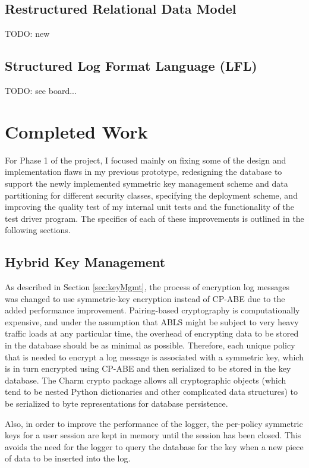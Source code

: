 \documentclass{sig-alternate}
\begin{document}
\subsection{Restructured Relational Data Model}
TODO: new 

\subsection{Structured Log Format Language (LFL)}
TODO: see board...

\section{Completed Work}
For Phase 1 of the project, I focused mainly on fixing some of the design and implementation flaws in my previous 
prototype, redesigning the database to support the newly implemented symmetric key management scheme and data 
partitioning for different security classes, specifying the deployment scheme, and improving the quality test
of my internal unit tests and the functionality of the test driver program. The specifics of each of these improvements is
outlined in the following sections.

\subsection{Hybrid Key Management}
As described in Section \ref{sec:keyMgmt}, the process of encryption log messages was changed to use symmetric-key
encryption instead of CP-ABE due to the added performance improvement. Pairing-based cryptography is computationally
expensive, and under the assumption that ABLS might be subject to very heavy traffic loads at any particular time, the 
overhead of encrypting data to be stored in the database should be as minimal as possible. Therefore, each unique
policy that is needed to encrypt a log message is associated with a symmetric key, which is in turn encrypted using 
CP-ABE and then serialized to be stored in the key database. The Charm crypto package allows all cryptographic 
objects (which tend to be nested Python dictionaries and other complicated data structures) to be serialized to byte 
representations for database persistence. 

Also, in order to improve the performance of the logger, the per-policy symmetric keys for a user session are kept
in memory until the session has been closed. This avoids the need for the logger to query the database for the key 
when a new piece of data to be inserted into the log. 
\end{document}
